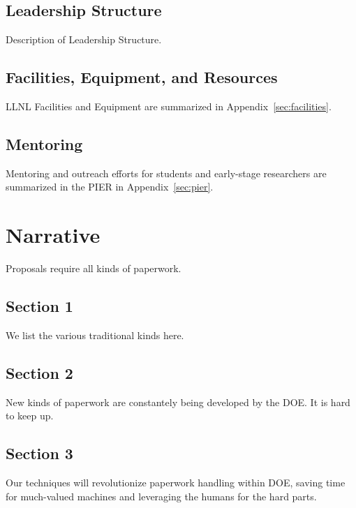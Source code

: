 \documentclass[11pt]{article}
\begin{document}
\subsection*{Leadership Structure}

Description of Leadership Structure.

\subsection*{Facilities, Equipment, and Resources}

LLNL Facilities and Equipment are summarized in Appendix~\ref{sec:facilities}.

\subsection*{Mentoring}

Mentoring and outreach efforts for students and early-stage researchers are summarized
in the PIER in Appendix~\ref{sec:pier}.

\newpage
\renewcommand{\baselinestretch}{1.0}\normalsize
\tableofcontents
\renewcommand{\baselinestretch}{1.0}\normalsize


\newpage
{}
\section{Narrative}

Proposals require all kinds of paperwork.

\subsection{Section 1}
We list the various traditional kinds here.

\subsection{Section 2}
New kinds of paperwork are constantely being developed by the DOE. It is hard to keep
up.

\subsection{Section 3}
Our techniques will revolutionize paperwork handling within DOE, saving time for
much-valued machines and leveraging the humans for the hard parts.
\end{document}
